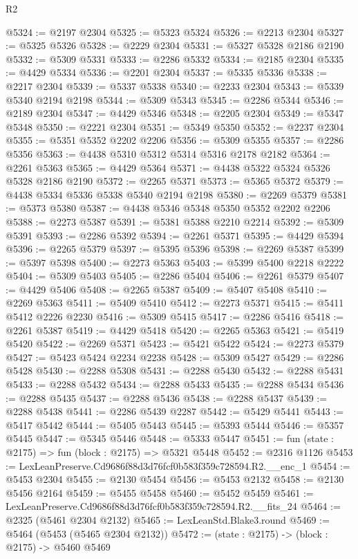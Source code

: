 \begin{lexlean}{R2}
\begin{coremodule}
@5324 := @2197 @2304
@5325 := @5323 @5324
@5326 := @2213 @2304
@5327 := @5325 @5326
@5328 := @2229 @2304
@5331 := @5327 @5328 @2186 @2190
@5332 := @5309 @5331
@5333 := @2286 @5332
@5334 := @2185 @2304
@5335 := @4429 @5334
@5336 := @2201 @2304
@5337 := @5335 @5336
@5338 := @2217 @2304
@5339 := @5337 @5338
@5340 := @2233 @2304
@5343 := @5339 @5340 @2194 @2198
@5344 := @5309 @5343
@5345 := @2286 @5344
@5346 := @2189 @2304
@5347 := @4429 @5346
@5348 := @2205 @2304
@5349 := @5347 @5348
@5350 := @2221 @2304
@5351 := @5349 @5350
@5352 := @2237 @2304
@5355 := @5351 @5352 @2202 @2206
@5356 := @5309 @5355
@5357 := @2286 @5356
@5363 := @4438 @5310 @5312 @5314 @5316 @2178 @2182
@5364 := @2261 @5363
@5365 := @4429 @5364
@5371 := @4438 @5322 @5324 @5326 @5328 @2186 @2190
@5372 := @2265 @5371
@5373 := @5365 @5372
@5379 := @4438 @5334 @5336 @5338 @5340 @2194 @2198
@5380 := @2269 @5379
@5381 := @5373 @5380
@5387 := @4438 @5346 @5348 @5350 @5352 @2202 @2206
@5388 := @2273 @5387
@5391 := @5381 @5388 @2210 @2214
@5392 := @5309 @5391
@5393 := @2286 @5392
@5394 := @2261 @5371
@5395 := @4429 @5394
@5396 := @2265 @5379
@5397 := @5395 @5396
@5398 := @2269 @5387
@5399 := @5397 @5398
@5400 := @2273 @5363
@5403 := @5399 @5400 @2218 @2222
@5404 := @5309 @5403
@5405 := @2286 @5404
@5406 := @2261 @5379
@5407 := @4429 @5406
@5408 := @2265 @5387
@5409 := @5407 @5408
@5410 := @2269 @5363
@5411 := @5409 @5410
@5412 := @2273 @5371
@5415 := @5411 @5412 @2226 @2230
@5416 := @5309 @5415
@5417 := @2286 @5416
@5418 := @2261 @5387
@5419 := @4429 @5418
@5420 := @2265 @5363
@5421 := @5419 @5420
@5422 := @2269 @5371
@5423 := @5421 @5422
@5424 := @2273 @5379
@5427 := @5423 @5424 @2234 @2238
@5428 := @5309 @5427
@5429 := @2286 @5428
@5430 := @2288 @5308
@5431 := @2288 @5430
@5432 := @2288 @5431
@5433 := @2288 @5432
@5434 := @2288 @5433
@5435 := @2288 @5434
@5436 := @2288 @5435
@5437 := @2288 @5436
@5438 := @2288 @5437
@5439 := @2288 @5438
@5441 := @2286 @5439 @2287
@5442 := @5429 @5441
@5443 := @5417 @5442
@5444 := @5405 @5443
@5445 := @5393 @5444
@5446 := @5357 @5445
@5447 := @5345 @5446
@5448 := @5333 @5447
@5451 := fun (state : @2175) => fun (block : @2175) => @5321 @5448
@5452 := @2316 @1126
@5453 := LexLeanPreserve.Cd9686f88d3d76fcf0b583f359c728594.R2.__enc_1
@5454 := @5453 @2304
@5455 := @2130 @5454
@5456 := @5453 @2132
@5458 := @2130 @5456 @2164
@5459 := @5455 @5458
@5460 := @5452 @5459
@5461 := LexLeanPreserve.Cd9686f88d3d76fcf0b583f359c728594.R2.__fits_24
@5464 := @2325 (@5461 @2304 @2132)
@5465 := LexLeanStd.Blake3.round
@5469 := @5464 (@5453 (@5465 @2304 @2132))
@5472 := (state : @2175) -> (block : @2175) -> @5460 @5469

\end{coremodule}
\end{lexlean}
